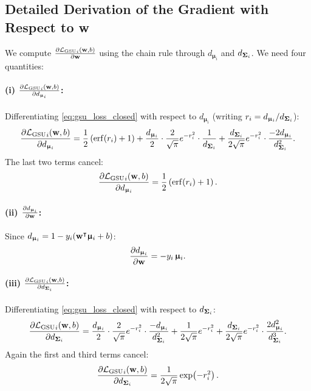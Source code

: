 \documentclass[11pt, letterpaper]{article}
\newcommand{\bSigma}{\vb{\Sigma}}
\newcommand{\bmu}{\boldsymbol{\upmu}}
\newcommand{\loss}{\mathcal{L}}
\begin{document}
\subsection{Detailed Derivation of the Gradient with Respect to w}

We compute $\pdv{{\loss_{\text{GSU}}}_{i}(\vb{w}, b)}{\vb{w}}$ using the chain rule through $d_{\bmu_i}$ and $d_{\bSigma_i}$. We need four quantities:

\paragraph{(i) $\pdv{{\loss_{\text{GSU}}}_{i}(\vb{w}, b)}{d_{\bmu_i}}$:} Differentiating \cref{eq:gsu_loss_closed} with respect to $d_{\bmu_i}$ (writing $r_i = d_{\bmu_i}/d_{\bSigma_i}$):
\begin{equation}
    \pdv{{\loss_{\text{GSU}}}_{i}(\vb{w}, b)}{d_{\bmu_i}} = \frac{1}{2}\left(\mathrm{erf}(r_i) + 1\right) + \frac{d_{\bmu_i}}{2} \cdot \frac{2}{\sqrt{\pi}} e^{-r_i^2} \cdot \frac{1}{d_{\bSigma_i}} + \frac{d_{\bSigma_i}}{2\sqrt{\pi}} e^{-r_i^2} \cdot \frac{-2 d_{\bmu_i}}{d_{\bSigma_i}^2}.
\end{equation}
The last two terms cancel:
\begin{equation}\label{eq:dL_ddmu}
    \pdv{{\loss_{\text{GSU}}}_{i}(\vb{w}, b)}{d_{\bmu_i}} = \frac{1}{2}\left(\mathrm{erf}(r_i) + 1\right).
\end{equation}

\paragraph{(ii) $\pdv{d_{\bmu_i}}{\vb{w}}$:} Since $d_{\bmu_i} = 1 - y_i(\vb{w}^{\intercal} \bmu_i + b)$:
\begin{equation}\label{eq:ddmu_dw}
    \pdv{d_{\bmu_i}}{\vb{w}} = -y_i\, \bmu_i.
\end{equation}

\paragraph{(iii) $\pdv{{\loss_{\text{GSU}}}_{i}(\vb{w}, b)}{d_{\bSigma_i}}$:} Differentiating \cref{eq:gsu_loss_closed} with respect to $d_{\bSigma_i}$:
\begin{equation}
    \pdv{{\loss_{\text{GSU}}}_{i}(\vb{w}, b)}{d_{\bSigma_i}} = \frac{d_{\bmu_i}}{2} \cdot \frac{2}{\sqrt{\pi}} e^{-r_i^2} \cdot \frac{-d_{\bmu_i}}{d_{\bSigma_i}^2} + \frac{1}{2\sqrt{\pi}} e^{-r_i^2} + \frac{d_{\bSigma_i}}{2\sqrt{\pi}} e^{-r_i^2} \cdot \frac{2 d_{\bmu_i}^2}{d_{\bSigma_i}^3}.
\end{equation}
Again the first and third terms cancel:
\begin{equation}\label{eq:dL_ddSigma}
    \pdv{{\loss_{\text{GSU}}}_{i}(\vb{w}, b)}{d_{\bSigma_i}} = \frac{1}{2\sqrt{\pi}} \exp\!\left(-r_i^2\right).
\end{equation}
\end{document}
